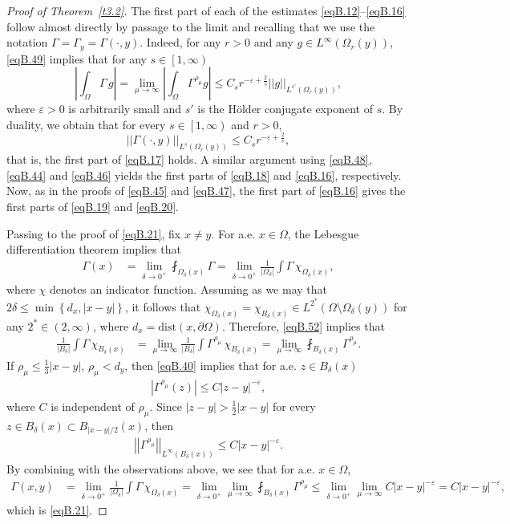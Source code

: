 \documentclass[12pt,reqno]{amsart}
\theoremstyle{plain}
\theoremstyle{definition}
\newenvironment{pf}
{\begin{proof}} {\end{proof}}
\newcommand{\eps}{\varepsilon}
\newcommand{\de}{\delta}
\newcommand{\Ga}{\Gamma}
\newcommand{\Om}{\Omega}
\newcommand{\iny}{\infty}
\newcommand{\su}{\subset}
\newcommand{\norm}[1]{\left\vert \left\vert #1\right\vert\right\vert}
\newcommand{\abs}[1]{\left\vert#1\right\vert}
\newcommand{\set}[1]{\left\{#1\right\}}
\newcommand{\pr}[1]{\left( #1 \right) }
\newcommand{\brp}[1]{\left[#1\right)}
\begin{document}
\begin{appendix}
\begin{pf}[Proof of Theorem~\ref{t3.2}]
The first part of each of the estimates \eqref{eqB.12}--\eqref{eqB.16} follow almost directly by passage to the limit and recalling that we use the notation $\Ga = \Ga_y = \Ga\pr{\cdot, y}$. 
Indeed, for any $r > 0$ and any $g \in L^\infty\pr{\Om_r\pr{y}}$, \eqref{eqB.49} implies that for any $s \in \brp{1, \iny}$
$$\abs{\int_{\Om} \Ga \, g}
= \lim_{\mu\to \infty} \abs{\int_{\Om} \Ga^{\rho_\mu} g}
\le C_s r^{-\eps+\frac{2}{s}} \norm{g}_{L^{s'}\pr{\Om_r\pr{y}}},$$
where $\eps > 0$ is arbitrarily small and $s'$ is the H\"older conjugate exponent of $s$.  
By duality, we obtain that for every $s \in \brp{1, \iny}$ and $r > 0$,
$$\norm{\Ga\pr{\cdot, y}}_{L^s\pr{\Om_r\pr{y}}} 
\le C_s r^{-\eps+\frac{2}{s}},$$
that is, the first part of \eqref{eqB.17} holds. 
A similar argument using \eqref{eqB.48}, \eqref{eqB.44} and \eqref{eqB.46} yields the first parts of \eqref{eqB.18} and \eqref{eqB.16}, respectively. 
Now, as in the proofs of  \eqref{eqB.45} and \eqref{eqB.47}, the first part of \eqref{eqB.16} gives the first parts of \eqref{eqB.19} and \eqref{eqB.20}.

Passing to the proof of \eqref{eqB.21}, fix $x \ne y$. For a.e. $x \in \Om$, the Lebesgue differentiation theorem implies that
\begin{align*}
\Ga\pr{x} 
&= \lim_{\de \to 0^+} \fint_{\Om_\de\pr{x}} \Ga
= \lim_{\de \to 0^+} \frac{1}{\abs{\Om_\de}} \int \Ga \, \chi_{\Om_\de\pr{x}},
\end{align*}
where $\chi$ denotes an indicator function.
Assuming as we may that $2\de \le \min\set{d_x, \abs{x - y}}$, it follows that $\chi_{\Om_\de\pr{x}} = \chi_{B_\de\pr{x}} \in L^{2^*}\pr{\Om\setminus \Om_{\de}\pr{y}}$ for any $2^* \in \pr{2, \iny}$, where $d_x=\mbox{dist}(x,\partial\Omega)$.  
Therefore, \eqref{eqB.52} implies that
\begin{align*}
\frac{1}{\abs{B_\de}}  \int \Ga \, \chi_{B_\de\pr{x}}
&= \lim_{\mu \to \iny} \frac{1}{\abs{B_\de}} \int \Ga^{\rho_\mu} \, \chi_{B_\de\pr{x}}
= \lim_{\mu \to \iny} \fint_{B_\de\pr{x}} \Ga^{\rho_\mu}.
\end{align*}
If $\rho_\mu \le \frac 1 3 \abs{x - y}$, $\rho_\mu<d_y$,  then \eqref{eqB.40} implies that for a.e. $z \in B_\de\pr{x}$
\begin{align*}
\abs{\Ga^{\rho_\mu}\pr{z}}
\le C \abs{z-y}^{-\eps},
\end{align*}
where $C$ is independent of $\rho_\mu$.
Since $\abs{z - y} >\frac{1}{2} \abs{x - y}$ for every $z \in B_\de\pr{x} \su B_{\abs{x-y}/2}\pr{x}$, then
\begin{align*}
\norm{\Ga^{\rho_\mu}}_{L^\iny\pr{B_\de\pr{x}}} \le C \abs{x - y}^{-\eps}.
\end{align*}
By combining with the observations above, we see that for a.e. $x \in \Om$,
\begin{align*}
\Ga\pr{x, y} 
&= \lim_{\de \to 0^+} \frac{1}{\abs{\Om_\de}} \int \Ga \, \chi_{\Om_\de\pr{x}}
= \lim_{\de \to 0^+}  \lim_{\mu \to \iny} \fint_{B_\de\pr{x}} \Ga^{\rho_\mu}
\le \lim_{\de \to 0^+}  \lim_{\mu \to \iny} C \abs{x - y}^{-\eps}
= C \abs{x - y}^{-\eps},
\end{align*}
which is \eqref{eqB.21}.


\end{pf}
\end{appendix}
\end{document}
